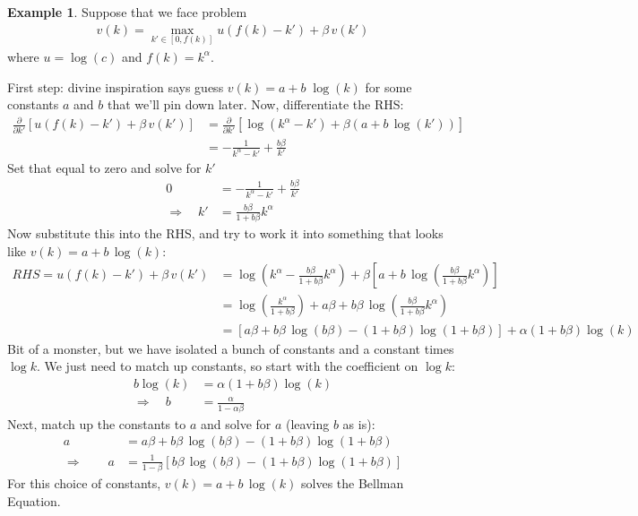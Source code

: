 \documentclass[12pt]{article}
\numberwithin{equation}{section} %
\theoremstyle{plain}
\theoremstyle{definition}
\newtheorem{ex}[thm]{Example}
\theoremstyle{remark}
\begin{document}
\begin{ex}
Suppose that we face problem
\begin{align*}
  v(k) = \max_{k'\in[0,f(k)]} u(f(k)-k') + \beta\, v(k')
\end{align*}
where $u=\log(c)$ and $f(k)=k^\alpha$.

First step: divine inspiration says guess $v(k) = a + b \; \log(k)$ for
some constants $a$ and $b$ that we'll pin down later.
Now, differentiate the RHS:
\begin{align*}
  \frac{\partial}{\partial k'}
  \left[
  u(f(k)-k') + \beta\, v(k')
  \right]
  &=
  \frac{\partial}{\partial k'}
  \left[
    \log\left(
    k^\alpha - k'
    \right)
    + \beta (a + b\, \log(k'))
  \right] \\
  &= -\frac{1}{k^\alpha-k'}
  + \frac{b\beta}{k'}
\end{align*}
Set that equal to zero and solve for $k'$
\begin{align*}
  0
  &= -\frac{1}{k^\alpha-k'}
  + \frac{b\beta}{k'}\\
  \Rightarrow\quad
  k' &= \frac{b\beta}{1+b\beta} k^\alpha
\end{align*}
Now substitute this into the RHS, and try to work it into something that
looks like $v(k) = a + b\,\log(k)$:
\begin{align*}
  RHS = u(f(k)-k') + \beta \, v(k')
  &=
  \log\left(
    k^\alpha - \frac{b\beta}{1+b\beta} k^\alpha
  \right)
  + \beta
    \left[
      a + b\,\log\left(\frac{b\beta}{1+b\beta} k^\alpha\right)
    \right] \\
  &=
  \log\left(
    \frac{k^\alpha}{1+b\beta}
  \right)
  + a\beta + b\beta\,\log\left(\frac{b\beta}{1+b\beta} k^\alpha\right) \\
  &=
  [a\beta
  + b\beta\,\log\left(b\beta\right)
  - (1+b\beta)\log\left( 1+b\beta \right)]
  +\alpha(1+b\beta)\log\left( k \right)
\end{align*}
Bit of a monster, but we have isolated a bunch of constants and a
constant times $\log k$. We just need to match up constants, so start
with the coefficient on $\log k$:
\begin{align*}
  b\log(k)
  &= \alpha(1+b\beta) \log(k) \\
  \Rightarrow\quad
  b &= \frac{\alpha}{1-\alpha \beta}
\end{align*}
Next, match up the constants to $a$ and solve for $a$ (leaving $b$ as
is):
\begin{align*}
  a
  &=
  a\beta + b\beta\,\log\left(b\beta\right)
  - (1+b\beta)\log\left( 1+b\beta \right) \\
  \Rightarrow\qquad
  a
  &=
  \frac{1}{1-\beta}
  \left[
    b\beta\,\log\left(b\beta\right)
  - (1+b\beta)\log\left( 1+b\beta \right) \right]
\end{align*}
For this choice of constants, $v(k) = a + b\,\log(k)$ solves the Bellman
Equation.
\end{ex}
\end{document}
